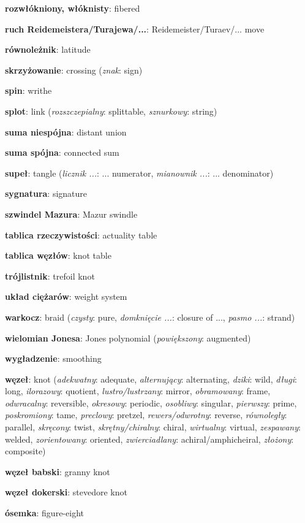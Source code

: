 \item \textbf{rozwłókniony, włóknisty}: fibered
\item \textbf{ruch Reidemeistera/Turajewa/...}: Reidemeister/Turaev/... move
\item \textbf{równoleżnik}: latitude
\item \textbf{skrzyżowanie}: crossing
(\emph{znak}: sign)
\item \textbf{spin}: writhe
\item \textbf{splot}: link
(\emph{rozszczepialny}: splittable, \emph{sznurkowy}: string)
\item \textbf{suma niespójna}: distant union
\item \textbf{suma spójna}: connected sum
\item \textbf{supeł}: tangle
(\emph{licznik ...}: ... numerator, \emph{mianownik ...}: ... denominator)
\item \textbf{sygnatura}: signature
\item \textbf{szwindel Mazura}: Mazur swindle
\item \textbf{tablica rzeczywistości}: actuality table
\item \textbf{tablica węzłów}: knot table
\item \textbf{trójlistnik}: trefoil knot
\item \textbf{układ ciężarów}: weight system
\item \textbf{warkocz}: braid
(\emph{czysty}: pure, \emph{domknięcie ...}: closure of ..., \emph{pasmo ...}: strand)
\item \textbf{wielomian Jonesa}: Jones polynomial
(\emph{powiększony}: augmented)
\item \textbf{wygładzenie}: smoothing
\item \textbf{węzeł}: knot
(\emph{adekwatny}: adequate, \emph{alternujący}: alternating, \emph{dziki}: wild, \emph{długi}: long, \emph{ilorazowy}: quotient, \emph{lustro/lustrzany}: mirror, \emph{obramowany}: frame, \emph{odwracalny}: reversible, \emph{okresowy}: periodic, \emph{osobliwy}: singular, \emph{pierwszy}: prime, \emph{poskromiony}: tame, \emph{preclowy}: pretzel, \emph{rewers/odwrotny}: reverse, \emph{równoległy}: parallel, \emph{skręcony}: twist, \emph{skrętny/chiralny}: chiral, \emph{wirtualny}: virtual, \emph{zespawany}: welded, \emph{zorientowany}: oriented, \emph{zwierciadlany}: achiral/amphicheiral, \emph{złożony}: composite)
\item \textbf{węzeł babski}: granny knot
\item \textbf{węzeł dokerski}: stevedore knot
\item \textbf{ósemka}: figure-eight
